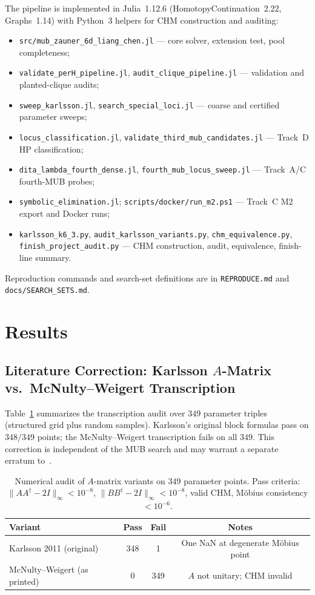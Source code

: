 \documentclass[onecolumn]{IEEEtran}
\begin{document}
The pipeline is implemented in Julia~1.12.6 (HomotopyContinuation~2.22, Graphs~1.14) with Python~3 helpers for CHM construction and auditing:
\begin{itemize}
    \item \texttt{src/mub\_zauner\_6d\_liang\_chen.jl} --- core solver, extension test, pool completeness;
    \item \texttt{validate\_perH\_pipeline.jl}, \texttt{audit\_clique\_pipeline.jl} --- validation and planted-clique audits;
    \item \texttt{sweep\_karlsson.jl}, \texttt{search\_special\_loci.jl} --- coarse and certified parameter sweeps;
    \item \texttt{locus\_classification.jl}, \texttt{validate\_third\_mub\_candidates.jl} --- Track~D HP classification;
    \item \texttt{dita\_lambda\_fourth\_dense.jl}, \texttt{fourth\_mub\_locus\_sweep.jl} --- Track~A/C fourth-MUB probes;
    \item \texttt{symbolic\_elimination.jl}; \texttt{scripts/docker/run\_m2.ps1} --- Track~C M2 export and Docker runs;
    \item \texttt{karlsson\_k6\_3.py}, \texttt{audit\_karlsson\_variants.py}, \texttt{chm\_equivalence.py}, \texttt{finish\_project\_audit.py} --- CHM construction, audit, equivalence, finish-line summary.
\end{itemize}
Reproduction commands and search-set definitions are in \texttt{REPRODUCE.md} and \texttt{docs/SEARCH\_SETS.md}.

\section{Results}
\label{sec:results}

\subsection{Literature Correction: Karlsson $A$-Matrix vs.\ McNulty--Weigert Transcription}
\label{sec:audit}
Table~\ref{tab:audit} summarizes the transcription audit over $349$ parameter triples (structured grid plus random samples).
Karlsson's original block formulas pass on $348/349$ points; the McNulty--Weigert transcription fails on all $349$.
This correction is independent of the MUB search and may warrant a separate erratum to~\cite{McNulty2024}.

\begin{table}[t]
\caption{Numerical audit of $A$-matrix variants on $349$ parameter points. Pass criteria: $\|AA^\dagger-2I\|_\infty<10^{-8}$, $\|BB^\dagger-2I\|_\infty<10^{-8}$, valid CHM, M\"obius consistency $<10^{-6}$.}
\label{tab:audit}
\centering
\begin{tabular}{@{}lccc@{}}
\toprule
Variant & Pass & Fail & Notes \\
\midrule
Karlsson 2011 (original) & 348 & 1 & One NaN at degenerate M\"obius point \\
McNulty--Weigert (as printed) & 0 & 349 & $A$ not unitary; CHM invalid \\
\bottomrule
\end{tabular}
\end{table}
\end{document}
